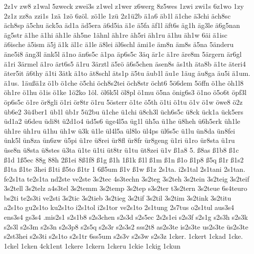 {2z1v zw8 z1wal 5zweck zwei3s z1wel z1wer z6werg 8z5wes 1zwi zwi1s
6z1wo 1zy 2z1z zz8a zzi1s 1z\"a 1z\"o 6z\"ol. z\"o1le
1z\"u 2z1\"u2b \"a1a6 \"ab1l \"a1che \"a3chi
\"ach8sc \"ach8sp \"a5chu \"ack5a \"ad1a \"ad5era
\"a6d5ia \"a1e \"a5fa \"af1l \"aft6s \"ag1h
\"ag3le \"a6g5nan \"ag5str \"a1he \"a1hi \"ah1le
\"ah5ne 1\"ahnl \"ah1re \"ah5ri \"ah1ru \"a1hu
\"ah1w 6\"ai \"a1isc \"a6ische \"a5ism \"a5j
\"a1k \"al1c \"a1le \"a8lei \"al6schl \"ami1e
\"am8n \"am8s \"a5na 5\"anderu \"ane5i8 \"ang3l
\"ank5l \"a1no \"an6s5c \"a1pa \"ap6s5c 3\"aq
\"ar1c \"a1re \"are8m 5\"argern \"ar6gl \"a1ri
3\"armel \"a1ro \"art6s5 \"a1ru 3\"arztl \"a5r\"o
\"a6s5chen \"asen8s \"as1th \"ata8b \"a1te \"ateri4
\"ater5it \"a6thy \"a1ti 3\"atk \"a1to \"at8schl
\"ats1p \"a5tu \"aub1l \"au1e 1\"aug \"au8ga
\"au5i \"a1um. \"a1us. 1\"au\ss  \"a1z
\"o1b \"o1che \"o5chi 
\"och8s2tei %
\"och8str \"ocht6
5\"o6dem 5\"offn \"o1he \"oh1l8 \"oh1re \"o1hu
\"o1is \"o1ke 1\"o2ko 1\"ol. \"ol6k5l \"ol8pl
\"o1mu \"o5na \"onig6s3 \"o1no \"o5o6t \"opf3l
\"op6s5c \"o1re \"or8gli \"o1ri \"or8tr \"o1ru
5\"osterr \"o1te \"o5th \"o1ti \"o1tu \"o1v \"o1w
\"owe8 \"o2z \"ub6e2 3\"u4ber1 \"ub1l \"ub1r
5\"u2bu \"u1che \"u1chi \"u8ch3l \"uch6s5c \"u8ck
\"uck1a \"uck5ers \"ud1a2 \"u6deu \"udi8t \"u2d1o4
\"ud5s6 \"uge4l5a \"ug1l \"uh5a \"u1he \"u8heh
\"u6h5erk \"uh1le \"uh1re \"uh1ru \"u1hu \"uh1w
\"u3k \"u1le \"ul4l5a \"ul8lo \"ul4ps \"ul6s5c
\"u1lu \"un8da \"un8fei \"unk5l \"un8za \"un6zw
\"u5pi \"u1re \"u8rei \"ur8fl \"ur8fr \"ur8geng
\"u1ri \"u1ro \"ur8sta 
\"u1ru \"use8n
\"u8sta \"u8stes 
 \"u3ta \"u1te \"u1ti
\"ut8tr \"u1tu \"ut8zei \"u1v \ss1a8  5\ssa.
 \ss8as  \ss1b8  \ss1c  \ss1d 
1\sse  \ss5ec  8\sse8g  8\sse8h 
2\ss1ei  8\ssem  \ss1f8  \ss1g  \ss1h
 1\ssi  \ss1k  \ss1l  \ss1m 
\ss1n  \ss1o  \ss1p8  \ss5q
 \ss1r  \ss1s2    \ss1ta 
\ss1te  \sst3hei  \ss1ti  \ss5to 
\ss1tr  1  6\ss5um  \ss1v  \ss1w
 \ss1z 
%
%
2s1ta.
i2s1tal
2s1tani 2s1tan.
fe2s1ta
te2s1ta
%
nd2ste
ve2ste
3s2tec
4s3techn
3s2teg
3s2teh
3s2tein 3s2teig 3s2teif 
3s2tell 3s2telz 
a4s3tel
3s2temm 
3s2temp
3s2tep
s3s2ter t3s2tern
3s2teue
6s4teuro
%
bs2ti
te2s3ti
ve2sti
3s2tic 
3s2tieb
3s2tieg
3s2tif 
3s2til 
3s2tim 
3s2tink
3s2titu
%
a2s1to
gu2s1to %
ku2s1to %
i2s1tol i2s1tor
ve2s1to
%
2s1tung
2s7tus
o2s1tul %
%
%
aus3s4 
ens3s4
gs3s4 
.mis2s1
s2s1b8 %
s2s3chen 
s2s3d %
s2s5ec %
2s2s1ei %
s2s3f %
s2s1g %
s2s3h %
s2s3k %
s2s3l %
s2s3m %
s2s3n %
s2s3p8 %
s2s5q %
s2s3r %
s2s3s2 %
sss2t8 %
as2s3te
is2s3te
us2s3te
\"us2s3te
s2st3hei %
s2s3ti %
s2s1to %
s2s1tr %
6ss5um %
s2s3v %
s2s3w %
s2s3z %
%
%
1cker.
1ckert
1ckad
1cke.
1ckel
1cken
4ck1ent
1ckere
1ckern
1ckeru
1ckie
1ckig
1ckun
}
\endinput

%
